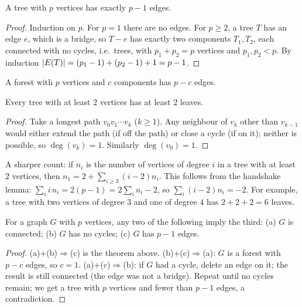 \begin{theorem}
A tree with $p$ vertices has exactly $p - 1$ edges.
\end{theorem}
\begin{proof}
Induction on $p$. For $p = 1$ there are no edges. For $p \ge 2$, a tree $T$ has an edge $e$,
which is a bridge, so $T - e$ has exactly two components $T_1, T_2$, each connected with no
cycles, i.e.\ trees, with $p_1 + p_2 = p$ vertices and $p_1, p_2 < p$. By induction
$\left\lvert E(T) \right\rvert = (p_1 - 1) + (p_2 - 1) + 1 = p - 1$.
\end{proof}

\begin{corollary}
A forest with $p$ vertices and $c$ components has $p - c$ edges.
\end{corollary}

\begin{theorem}
Every tree with at least $2$ vertices has at least $2$ leaves.
\end{theorem}
\begin{proof}
Take a longest path $v_0v_1\cdots v_k$ ($k \ge 1$). Any neighbour of $v_k$ other than $v_{k-1}$
would either extend the path (if off the path) or close a cycle (if on it); neither is possible,
so $\deg(v_k) = 1$. Similarly $\deg(v_0) = 1$.
\end{proof}

\begin{aside}
A sharper count: if $n_i$ is the number of vertices of degree $i$ in a tree with at least
$2$ vertices, then $n_1 = 2 + \sum_{i\ge3}(i-2)n_i$. This follows from the handshake lemma:
$\sum_i i\,n_i = 2(p-1) = 2\sum_i n_i - 2$, so $\sum_i (i-2)n_i = -2$. For example, a tree with
two vertices of degree $3$ and one of degree $4$ has $2 + 2 + 2 = 6$ leaves.
\end{aside}

\begin{theorem}
For a graph $G$ with $p$ vertices, any two of the following imply the third:
(a) $G$ is connected; (b) $G$ has no cycles; (c) $G$ has $p-1$ edges.
\end{theorem}
\begin{proof}
(a)+(b)$\Rightarrow$(c) is the theorem above. (b)+(c)$\Rightarrow$(a): $G$ is a forest with
$p - c$ edges, so $c = 1$. (a)+(c)$\Rightarrow$(b): if $G$ had a cycle, delete an edge on it; the
result is still connected (the edge was not a bridge). Repeat until no cycles remain; we get a
tree with $p$ vertices and fewer than $p - 1$ edges, a contradiction.
\end{proof}

